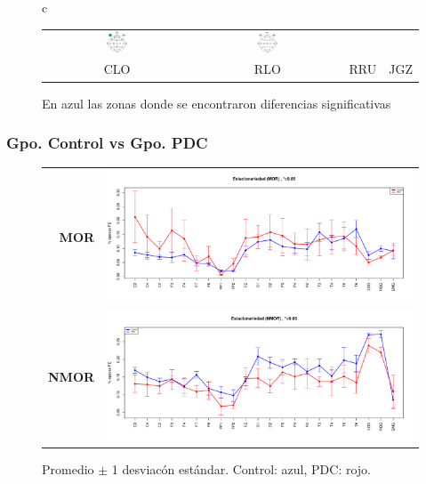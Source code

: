 \documentclass{beamer}
\begin{document}
\begin{frame}
\begin{figure}
\begin{tabular}{c}
\begin{tabular}{cccc}
\includegraphics[width=0.15\textwidth]{./cabecitas/cabecita_RRU.pdf} &
\includegraphics[width=0.15\textwidth]{./cabecitas/cabecita_JGZ.pdf} \\
CLO & RLO & RRU & JGZ
\end{tabular}
\end{tabular}
\caption{En azul las zonas donde se encontraron diferencias significativas}
\end{figure}
\end{frame}


\begin{frame}\frametitle{Gpo. Control vs Gpo. PDC}
\begin{figure}
\centering
\begin{tabular}{rl}
{\Large \textbf{MOR}}
&
\includegraphics[width=0.6\linewidth]
{./new170424/Comparacion_gpos_MOR.pdf} 
\\
{\Large \textbf{NMOR}}
&
\includegraphics[width=0.6\linewidth]
{./new170424/Comparacion_gpos_NMOR.pdf} 
\end{tabular}
\caption{ Promedio $\pm$ 1 desviac\'on est\'andar. Control: azul, PDC: rojo.}
\end{figure}
\end{frame}
\end{document}
